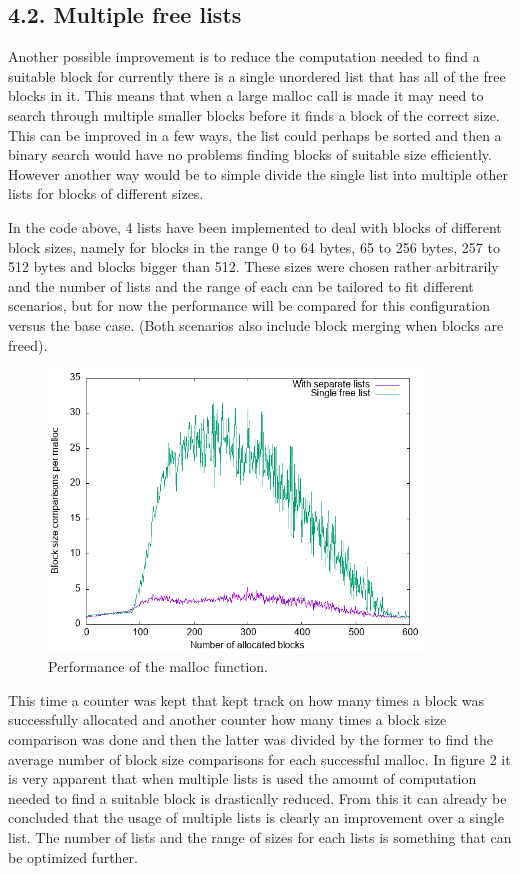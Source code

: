 \documentclass[a4paper,11pt]{scrartcl}
\begin{document}
{\subsection*{4.2. Multiple free lists}
Another possible improvement is to reduce the computation needed to find a suitable block for currently there is a single unordered list that has all of the free blocks in it. This means that when a large malloc call is made it may need to search through multiple smaller blocks before it finds a block of the correct size. This can be improved in a few ways, the list could perhaps be sorted and then a binary search would have no problems finding blocks of suitable size efficiently. However another way would be to simple divide the single list into multiple other lists for blocks of different sizes.

In the code above, 4 lists have been implemented to deal with blocks of different block sizes, namely for blocks in the range 0 to 64 bytes, 65 to 256 bytes, 257 to 512 bytes and blocks bigger than 512. These sizes were chosen rather arbitrarily and the number of lists and the range of each can be tailored to fit different scenarios, but for now the performance will be compared for this configuration versus the base case. (Both scenarios also include block merging when blocks are freed).
\newpage
\begin{figure}[htp]
    \centering
    \includegraphics[width=10cm]{gnuplot/find_call.png}
    \caption{Performance of the malloc function.}
    \label{fig:Graph}
\end{figure}
This time a counter was kept that kept track on how many times a block was successfully allocated and another counter how many times a block size comparison was done and then the latter was divided by the former to find the average number of block size comparisons for each successful malloc. In figure 2 it is very apparent that when multiple lists is used the amount of computation needed to find a suitable block is drastically reduced. From this it can already be concluded that the usage of multiple lists is clearly an improvement over a single list. The number of lists and the range of sizes for each lists is something that can be optimized further. 
}
\end{document}
